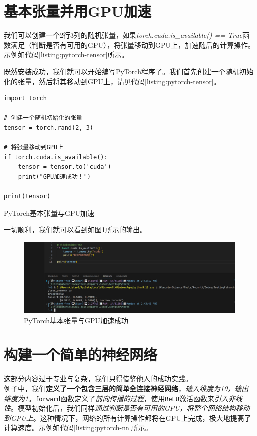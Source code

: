 \section{基本张量并用GPU加速}

我们可以创建一个2行3列的随机张量，如果\textit{torch.cuda.is\_available() == True}函数满足（判断是否有可用的GPU），将张量移动到GPU上，加速随后的计算操作。示例如代码\ref{listing:pytorch-tensor}所示。

既然安装成功，我们就可以开始编写PyTorch程序了。我们首先创建一个随机初始化的张量，然后将其移动到GPU上，请见代码\ref{listing:pytorch-tensor}。

\begin{longlisting}
    \begin{verbatim}
import torch

# 创建一个随机初始化的张量
tensor = torch.rand(2, 3)

# 将张量移动到GPU上
if torch.cuda.is_available():
    tensor = tensor.to('cuda')
    print("GPU加速成功！")
    
print(tensor)
    \end{verbatim}
    \caption{PyTorch基本张量与GPU加速}
    \label{listing:pytorch-tensor}
\end{longlisting}

一切顺利，我们就可以看到如图\ref{fig:pytorch-tensor}所示的输出。

\begin{figure}[htbp]
    \centering
    \includegraphics[width=\textwidth]{Figures/cudaOK.png}
    \caption{PyTorch基本张量与GPU加速成功}
    \label{fig:pytorch-tensor}
\end{figure}

\section{构建一个简单的神经网络}

这部分内容过于专业与复杂，我们只得借鉴他人的成功实践。\\

例子中，我们\textbf{定义了一个包含三层的简单全连接神经网络}，\textit{输入维度为10，输出维度为1}。\texttt{forward}函数定义了\textit{前向传播的过程}，使用\texttt{ReLU}激活函数来\textit{引入非线性}。模型初始化后，我们同样\textit{通过判断是否有可用的GPU，将整个网络结构移动到GPU上}。这种情况下，网络的所有计算操作都将在GPU上完成，极大地提高了计算速度。示例如代码\ref{listing:pytorch-nn}所示。

